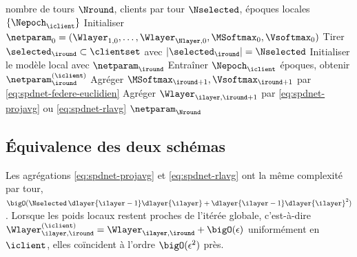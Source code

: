 \begin{algorithm}[htb]
  \caption{}
  \label{algo:spdnet-fedspdnet}
  \begin{algorithmic}[1]
    \Require nombre de tours $\Nround$, clients par tour $\Nselected$, époques locales $\{\Nepoch_\iclient\}$
    \State Initialiser $\netparam_0=(\Wlayer_{1,0},\dots,\Wlayer_{\Nlayer,0},\MSoftmax_0,\Vsoftmax_0)$
      \State Tirer $\selected_\iround\subset\clientset$ avec $|\selected_\iround|=\Nselected$
        \State Initialiser le modèle local avec $\netparam_\iround$
        \State Entraîner $\Nepoch_\iclient$ époques, obtenir $\netparam_\iround^{(\iclient)}$
      \EndFor
      \State Agréger $\MSoftmax_{\iround+1},\Vsoftmax_{\iround+1}$ par \cref{eq:spdnet-federe-euclidien}
        \State Agréger $\Wlayer_{\ilayer,\iround+1}$ par \cref{eq:spdnet-projavg} ou \cref{eq:spdnet-rlavg}
      \EndFor
    \EndFor
    \Ensure $\netparam_{\Nround}$
  \end{algorithmic}
\end{algorithm}

\subsection{Équivalence des deux schémas}
\label{sec:spdnet-federe-equivalence}

\begin{proposition}
\label{prop:spdnet-federe-equivalence}
  Les agrégations \cref{eq:spdnet-projavg} et \cref{eq:spdnet-rlavg} ont la même
  complexité par tour,
  $\bigO(\Nselected\,\dlayer{\ilayer-1}\dlayer{\ilayer}+\dlayer{\ilayer-1}\dlayer{\ilayer}^2)$.
  Lorsque les poids locaux restent proches de l'itérée globale, c'est-à-dire
  $\Wlayer^{(\iclient)}_{\ilayer,\iround}=\Wlayer_{\ilayer,\iround}+\bigO(\epsilon)$
  uniformément en $\iclient$, elles coïncident à l'ordre $\bigO(\epsilon^2)$ près.
\end{proposition}


